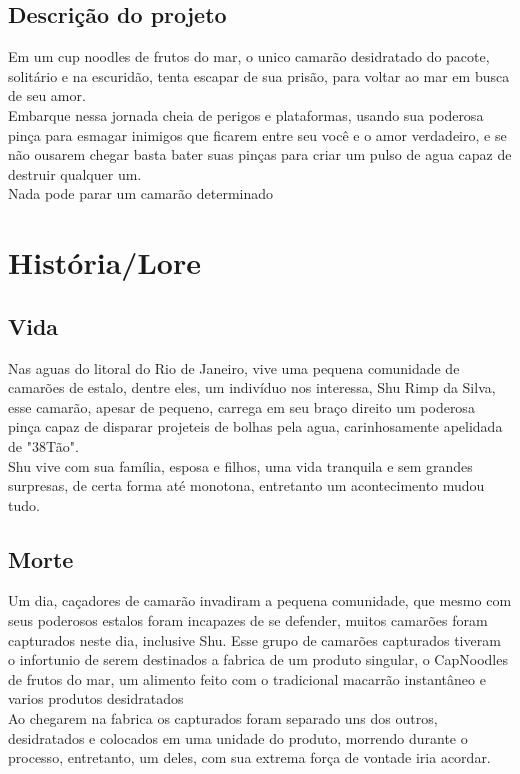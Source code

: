     \subsection{Descrição do projeto}%
Em um cup noodles de frutos do mar, o unico camarão desidratado do pacote, solitário e na escuridão, tenta escapar de sua prisão, para voltar ao mar em busca de seu amor.\\
Embarque nessa jornada cheia de perigos e plataformas, usando sua poderosa pinça para esmagar inimigos que ficarem entre seu você e o amor verdadeiro, e se não ousarem chegar basta bater suas pinças para criar um pulso de agua capaz de destruir qualquer um.\\
Nada pode parar um camarão determinado\\

   
\section{História/Lore}%
    \subsection{Vida}%
Nas aguas do litoral do Rio de Janeiro, vive uma pequena comunidade de camarões de estalo, dentre eles, um indivíduo nos interessa, Shu Rimp da Silva, esse camarão, apesar de pequeno, carrega em seu braço direito um poderosa pinça capaz de disparar projeteis de bolhas pela agua, carinhosamente apelidada de "38Tão".\\
Shu vive com sua família, esposa e filhos, uma vida tranquila e sem grandes surpresas, de certa forma até monotona, entretanto um acontecimento mudou tudo.
    \subsection{Morte}%
Um dia, caçadores de camarão invadiram a pequena comunidade, que mesmo com seus poderosos estalos foram incapazes de se defender, muitos camarões foram capturados neste dia, inclusive Shu. Esse grupo de camarões capturados tiveram o infortunio de serem destinados a fabrica de um produto singular, o CapNoodles de frutos do mar, um alimento feito com o tradicional macarrão instantâneo e varios produtos desidratados\\
Ao chegarem na fabrica os capturados foram separado uns dos outros, desidratados e colocados em uma unidade do produto, morrendo durante o processo, entretanto, um deles, com sua extrema força de vontade iria acordar.\\
